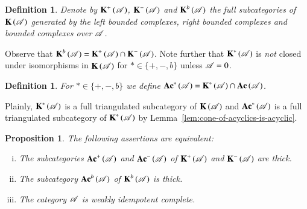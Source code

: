 \documentclass[1p]{elsarticle}
\theoremstyle{mythm}
\newtheorem{Prop}[Thm]{Proposition}
\theoremstyle{mydef}
\newtheorem{Def}[Thm]{Definition}
\begin{document}
\begin{Def}
  Denote by
  $\K^{+}{(\scrA)}$, $\K^{-}{(\scrA)}$ and $\K^{b}{(\scrA)}$ the full
  subcategories of $\K{(\scrA)}$ generated by the left bounded complexes,
  right bounded complexes and bounded
  complexes over $\scrA$.
\end{Def}

  Observe that $\K^{b}{(\scrA)} = \K^{+}{(\scrA)} \cap
  \K^{-}{(\scrA)}$.   
  Note further that $\K^{\ast}{(\scrA)}$ is
  \emph{not} closed under isomorphisms in $\K{(\scrA)}$ for 
  $\ast \in \{+, -, b\}$ unless $\scrA = 0$.

\begin{Def}
  For $\ast \in \{+, -, b\}$ we define
  $\Ac^{\ast}{(\scrA)} = \K^{\ast}{(\scrA)} \cap \Ac{(\scrA)}$.
\end{Def}

Plainly, $\K^{\ast}{(\scrA)}$ is a full triangulated subcategory of
$\K{(\scrA)}$ and $\Ac^{\ast}{(\scrA)}$ is a full triangulated subcategory of
$\K^{\ast}{(\scrA)}$ by Lemma~\ref{lem:cone-of-acyclics-is-acyclic}.


\begin{Prop}
  \label{prop:weakly-idemp-compl-equiv-thick}
  The following assertions are equivalent:
  \begin{enumerate}[(i)]
    \item
      The subcategories $\Ac^{+}{(\scrA)}$ and $\Ac^{-}{(\scrA)}$ of
      $\K^{+}{(\scrA)}$ and $\K^{-}{(\scrA)}$ are thick.

    \item
      The subcategory $\Ac^{b}{(\scrA)}$ of $\K^{b}{(\scrA)}$ is
      thick.
 
    \item
      The category $\scrA$ is weakly idempotent complete.
  \end{enumerate}
\end{Prop}
\end{document}
